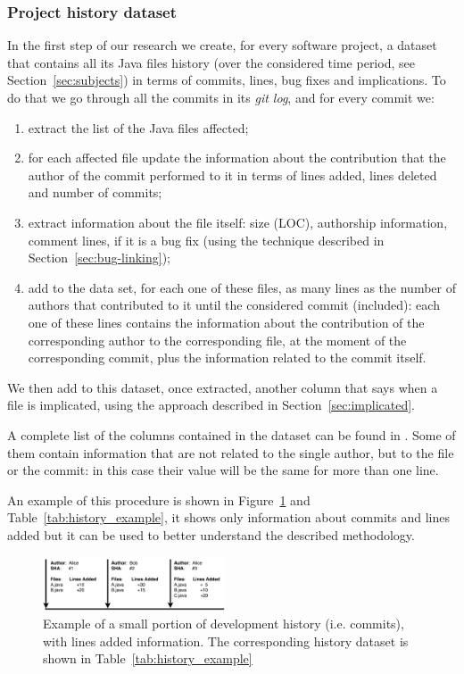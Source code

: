\subsubsection{Project history dataset}
\label{sec:history-dataset}

In the first step of our research we create, for every software project, a dataset that contains all its Java files history (over the considered time period, see Section~\ref{sec:subjects}) in terms of commits, lines, bug fixes and implications. To do that we go through all the commits in its \textit{git log}, and for every commit we:
\begin{enumerate}
\item extract the list of the Java files affected; 
\item for each affected file update the information about the contribution that the author of the commit performed to it in terms of lines added, lines deleted and number of commits;
\item extract information about the file itself: size (LOC), authorship information, comment lines, if it is a bug fix (using the technique described in Section~\ref{sec:bug-linking});
\item add to the data set, for each one of these files, as many lines as the number of authors that contributed to it until the considered commit (included): each one of these lines contains the information about the contribution of the corresponding author to the corresponding file, at the moment of the corresponding commit, plus the information related to the commit itself.
\end{enumerate}

We then add to this dataset, once extracted, another column that says when a file is implicated, using the approach described in Section~\ref{sec:implicated}.

A complete list of the columns contained in the dataset can be found in
. Some of them contain information that are not related to the single author, but to the file or the commit: in this case their value will be the same for more than one line.

An example of this procedure is shown in Figure~\ref{fig:history_example} and Table~\ref{tab:history_example}, it shows only information about commits and lines added but it can be used to better understand the described methodology.

\begin{figure}[ht]
    \centering
    \includegraphics[width=0.48\textwidth]{images/history_example.png}
    \caption{Example of a small portion of development history (i.e. commits), with lines added information. The corresponding history dataset is shown in Table~\ref{tab:history_example}}
    \label{fig:history_example}
\end{figure}

